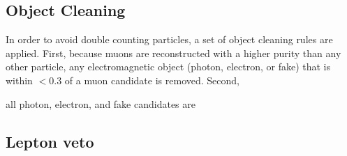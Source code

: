 \subsection{Object Cleaning}
\label{sec:ObjCleaning}

In order to avoid double counting particles, a set of object cleaning rules are applied. 
First, because muons are reconstructed with a higher purity than any other particle, 
any electromagnetic object (photon, electron, or fake) that is within \dR $< 0.3$ of a muon candidate is removed.
Second, 

all photon, electron, and fake candidates are 

\subsection{Lepton veto}
\label{sec:lepVeto}



